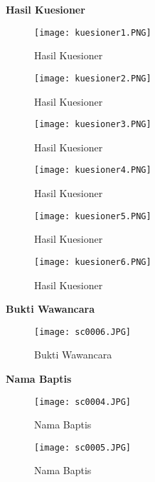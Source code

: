 \documentclass[a4paper,twoside]{article}
\begin{document}
\begin{enumerate}
\textbf{Hasil Kuesioner}

\begin{figure}[htbp]
		\centering
			\texttt{[image: kuesioner1.PNG]}
			\caption{Hasil Kuesioner}
		\label{fig:kues1}
	\end{figure}
	
	\begin{figure}[htbp]
		\centering
			\texttt{[image: kuesioner2.PNG]}
			\caption{Hasil Kuesioner}
		\label{fig:kues2}
	\end{figure}
	
	\begin{figure}[htbp]
		\centering
			\texttt{[image: kuesioner3.PNG]}
			\caption{Hasil Kuesioner}
		\label{fig:kues3}
	\end{figure}
	
	\begin{figure}[htbp]
		\centering
			\texttt{[image: kuesioner4.PNG]}
			\caption{Hasil Kuesioner}
		\label{fig:kues4}
	\end{figure}
	
	\begin{figure}[htbp]
		\centering
			\texttt{[image: kuesioner5.PNG]}
			\caption{Hasil Kuesioner}
		\label{fig:kues5}
	\end{figure}
	
	\begin{figure}[htbp]
		\centering
			\texttt{[image: kuesioner6.PNG]}
			\caption{Hasil Kuesioner}
		\label{fig:kues6}
	\end{figure}

\textbf{Bukti Wawancara
}
	\begin{figure}[htbp]
		\centering
			\texttt{[image: sc0006.JPG]}
			\caption{Bukti Wawancara}
		\label{fig:bukti}
	\end{figure}

	
\textbf{Nama Baptis}

\begin{figure}[htbp]
		\centering
			\texttt{[image: sc0004.JPG]}
			\caption{Nama Baptis}
		\label{fig:namabaptis1}
	\end{figure}
	
\begin{figure}[htbp]
		\centering
			\texttt{[image: sc0005.JPG]}
			\caption{Nama Baptis}
		\label{fig:namabaptis2}
	\end{figure}

	

\end{enumerate}
\end{document}
